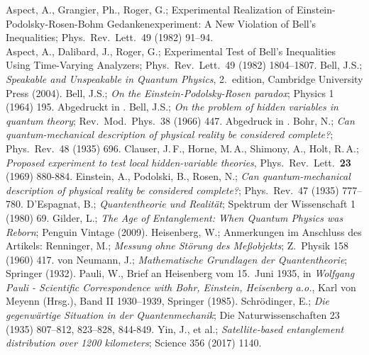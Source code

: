 \begin{thebibliography}{99}
 Aspect, A., Grangier, Ph., Roger, G.; 
       {Experimental Realization of Einstein-Podolsky-Rosen-Bohm 
        Gedankenexperiment: A New Violation of Bell's Inequalities}; 
        Phys.\ Rev.\ Lett.\ 49 (1982) 91--94. \\
        Aspect, A., Dalibard, J., Roger, G.; {Experimental Test 
        of Bell's Inequalities Using Time-Varying Analyzers}; 
        Phys.\ Rev.\ Lett.\ 49 (1982) 1804--1807.
 Bell, J.S.;  {\em Speakable and Unspeakable in 
        Quantum Physics}, 2.\ edition, Cambridge University Press (2004).                 
 Bell, J.S.; {\em On the Einstein-Podolsky-Rosen paradox};
        Physics 1 (1964) 195. Abgedruckt in \cite{Bell}.          
 Bell, J.S.; {\em On the problem of hidden variables
        in quantum theory}; Rev.\ Mod.\ Phys.~38 (1966) 447.
        Abgedruck in \cite{Bell}.
 Bohr, N.; {\em Can quantum-mechanical description
        of physical reality be considered complete?}; Phys.\ Rev.\ 48
        (1935) 696.       
 Clauser, J.\,F., Horne, M.\,A., Shimony, A., Holt, R.\,A.;
      {\em Proposed experiment to test local hidden-variable theories}, 
      Phys.\ Rev.\ Lett.\ {\bf 23} (1969) 880-884.          
 Einstein, A., Podolski, B., Rosen,
       N.; {\em Can quantum-mechanical description of
        physical reality be considered complete?}; Phys.\ Rev.\ 47
        (1935) 777--780.   
 D'Espagnat, B.; {\em Quantentheorie und Realit\"at};
        Spektrum der Wissenschaft 1 (1980) 69. 
 Gilder, L.; {\em The Age of Entanglement:
         When Quantum Physics was Reborn}; Penguin Vintage (2009).
 Heisenberg, W.; Anmerkungen im Anschluss des Artikels:
       Renninger, M.;  {\em Messung ohne St\"orung des Me\ss objekts}; Z.\ Physik 158 (1960) 417.
 von Neumann, J.; {\em Mathematische
    Grundlagen der Quantentheorie}; Springer (1932).       
 Pauli, W., Brief an Heisenberg vom 15.\ Juni 1935, in
             {\em Wolfgang Pauli - Scientific Correspondence with
             Bohr, Einstein, Heisenberg a.o.}, Karl von Meyenn (Hrsg.),
             Band II 1930--1939, Springer (1985).
 Schr\"odinger, E.; {\em Die gegenw\"artige
        Situation in der Quantenmechanik}; Die Naturwissenschaften 23
        (1935) 807--812, 823--828,  844-849.      
 Yin, J., et al.; \textit{Satellite-based entanglement distribution over
      1200 kilometers}; Science 356 (2017) 1140.    
\end{thebibliography}


%

